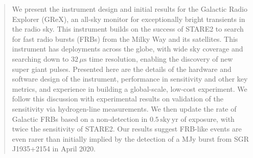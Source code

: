 \begin{abstract}

We present the instrument design and initial results for the Galactic Radio Explorer (GReX), an all-sky monitor for exceptionally bright transients in the radio sky.
This instrument builds on the success of STARE2 to search for fast radio bursts (FRBs) from the Milky Way and its satellites.
This instrument has deployments across the globe, with wide sky coverage and searching down to $32\,\mu\text{s}$ time resolution, enabling the discovery of new super giant pulses.
Presented here are the details of the hardware and software design of the instrument, performance in sensitivity and other key metrics, and experience in building a global-scale, low-cost experiment.
We follow this discussion with experimental results on validation of the sensitivity via hydrogen-line measurements. We then update the rate of Galactic FRBs based on a non-detection in $0.5\,\text{sky}\,\text{yr}$ of exposure, with twice the sensitivity of STARE2. 
Our results suggest FRB-like events are even rarer than initially implied by the detection of a MJy burst from SGR J1935+2154 in April 2020.

\end{abstract}



